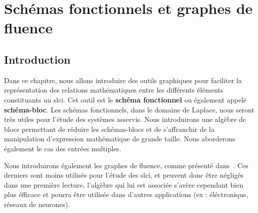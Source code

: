 \chapter[Schémas fonctionnels]
        {Schémas fonctionnels et graphes de fluence
        \label{chap-schemabloc}}
\minitoc
\newpage
\section{Introduction}
Dans ce chapitre, nous allons introduire des outils graphiques pour faciliter 
la représentation des relations mathématiques entre les différents 
éléments constituants un \gls{slci}. Cet outil est le 
\textbf{schéma fonctionnel} ou également appelé \textbf{schéma-bloc}. Les 
schémas fonctionnels, dans le domaine de Laplace, nous seront très utiles pour 
l'étude des systèmes asservis. Nous introduirons une algèbre de blocs 
permettant de réduire les schémas-blocs et de s'affranchir de la manipulation
d'expression mathématique de grande taille. Nous aborderons également le cas 
des entrées multiples. 

Nous introduirons également les graphes de fluence, comme présenté 
dans~\cite{Ostertag}. Ces derniers 
sont moins utilisés pour l'étude des \gls{slci}, et peuvent donc être négligés 
dans une première lecture, l'algèbre qui lui est associée s'avère cependant 
bien plus éfficace et pourra être utilisée dans d'autres 
applications (ex : éléctronique, réseaux de neurones).

